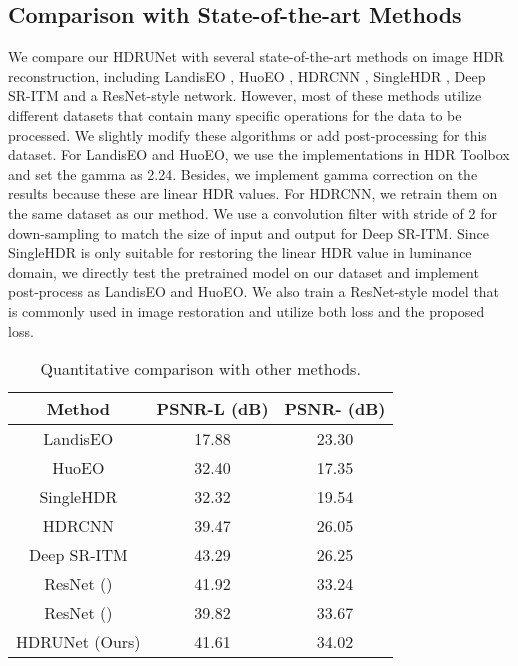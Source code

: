 \documentclass[final]{cvpr}
\begin{document}
\subsection{Comparison with State-of-the-art Methods}
We compare our HDRUNet with several state-of-the-art methods on image HDR reconstruction, including LandisEO \cite{landis2002production}, HuoEO \cite{huo2013dodging}, HDRCNN \cite{eilertsen2017hdr}, SingleHDR \cite{liu2020single}, Deep SR-ITM \cite{kim2019deep} and a ResNet-style \cite{he2016deep} network. However, most of these methods utilize different datasets that contain many specific operations for the data to be processed. We slightly modify these algorithms or add post-processing for this dataset. For LandisEO and HuoEO, we use the implementations in HDR Toolbox \cite{Banterle:2017} and set the gamma as 2.24. Besides, we implement gamma correction on the results because these are linear HDR values. For HDRCNN, we retrain them on the same dataset as our method. We use a convolution filter with stride of 2 for down-sampling to match the size of input and output for Deep SR-ITM. Since SingleHDR is only suitable for restoring the linear HDR value in luminance domain, we directly test the pretrained model on our dataset and implement post-process as LandisEO and HuoEO. We also train a ResNet-style model that is commonly used in image restoration and utilize both  loss and the proposed  loss.

\begin{table}[htbp]
	\begin{center}
		\begin{tabular}{ccc}
			\toprule
			Method & PSNR-L (dB) & PSNR- (dB) \\ \hline
			LandisEO & 17.88 & 23.30 \\ 
			HuoEO & 32.40 & 17.35 \\ 
			SingleHDR & 32.32 & 19.54 \\ 
			HDRCNN & 39.47 & 26.05 \\ 
			Deep SR-ITM & 43.29 & 26.25 \\ 
			ResNet () & 41.92 & 33.24 \\ 
			ResNet () & 39.82 & 33.67 \\ 
			HDRUNet (Ours) & 41.61 & 34.02 \\ 
			\bottomrule
		\end{tabular}
		
	\end{center}
	\caption{Quantitative comparison with other methods.}
	\label{tab:Quantitative Comparison}
\end{table}
\end{document}
